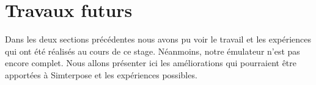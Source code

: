 \section{Travaux futurs}
\label{section:future_work}

Dans les deux sections précédentes nous avons pu voir le travail et les expériences qui ont été réalisés au cours de ce stage. Néanmoins, notre émulateur n'est pas encore complet. Nous allons présenter ici les améliorations qui pourraient être apportées à Simterpose et les expériences possibles.

